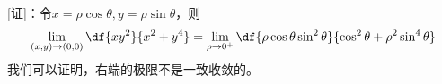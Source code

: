 \begin{center}
	\quad
\end{center}

[证]：令$x=\rho\cos\theta,y=\rho\sin\theta$，则
$$\lim\limits_{(x,y)\to(0,0)}\df{xy^2}{x^2+y^4}
=\lim\limits_{\rho\to0^+}\df{\rho\cos\theta\sin^2\theta}
{\cos^2\theta+\rho^2\sin^4\theta}$$
我们可以证明，右端的极限不是一致收敛的。

